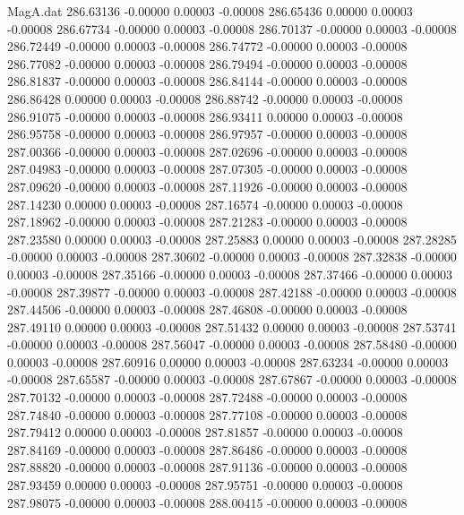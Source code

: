 \begin{filecontents}{MagA.dat}
 286.63136   -0.00000    0.00003   -0.00008
 286.65436    0.00000    0.00003   -0.00008
 286.67734   -0.00000    0.00003   -0.00008
 286.70137   -0.00000    0.00003   -0.00008
 286.72449   -0.00000    0.00003   -0.00008
 286.74772   -0.00000    0.00003   -0.00008
 286.77082   -0.00000    0.00003   -0.00008
 286.79494   -0.00000    0.00003   -0.00008
 286.81837   -0.00000    0.00003   -0.00008
 286.84144   -0.00000    0.00003   -0.00008
 286.86428    0.00000    0.00003   -0.00008
 286.88742   -0.00000    0.00003   -0.00008
 286.91075   -0.00000    0.00003   -0.00008
 286.93411    0.00000    0.00003   -0.00008
 286.95758   -0.00000    0.00003   -0.00008
 286.97957   -0.00000    0.00003   -0.00008
 287.00366   -0.00000    0.00003   -0.00008
 287.02696   -0.00000    0.00003   -0.00008
 287.04983   -0.00000    0.00003   -0.00008
 287.07305   -0.00000    0.00003   -0.00008
 287.09620   -0.00000    0.00003   -0.00008
 287.11926   -0.00000    0.00003   -0.00008
 287.14230    0.00000    0.00003   -0.00008
 287.16574   -0.00000    0.00003   -0.00008
 287.18962   -0.00000    0.00003   -0.00008
 287.21283   -0.00000    0.00003   -0.00008
 287.23580    0.00000    0.00003   -0.00008
 287.25883    0.00000    0.00003   -0.00008
 287.28285   -0.00000    0.00003   -0.00008
 287.30602   -0.00000    0.00003   -0.00008
 287.32838   -0.00000    0.00003   -0.00008
 287.35166   -0.00000    0.00003   -0.00008
 287.37466   -0.00000    0.00003   -0.00008
 287.39877   -0.00000    0.00003   -0.00008
 287.42188   -0.00000    0.00003   -0.00008
 287.44506   -0.00000    0.00003   -0.00008
 287.46808   -0.00000    0.00003   -0.00008
 287.49110    0.00000    0.00003   -0.00008
 287.51432    0.00000    0.00003   -0.00008
 287.53741   -0.00000    0.00003   -0.00008
 287.56047   -0.00000    0.00003   -0.00008
 287.58480   -0.00000    0.00003   -0.00008
 287.60916    0.00000    0.00003   -0.00008
 287.63234   -0.00000    0.00003   -0.00008
 287.65587   -0.00000    0.00003   -0.00008
 287.67867   -0.00000    0.00003   -0.00008
 287.70132   -0.00000    0.00003   -0.00008
 287.72488   -0.00000    0.00003   -0.00008
 287.74840   -0.00000    0.00003   -0.00008
 287.77108   -0.00000    0.00003   -0.00008
 287.79412    0.00000    0.00003   -0.00008
 287.81857   -0.00000    0.00003   -0.00008
 287.84169   -0.00000    0.00003   -0.00008
 287.86486   -0.00000    0.00003   -0.00008
 287.88820   -0.00000    0.00003   -0.00008
 287.91136   -0.00000    0.00003   -0.00008
 287.93459    0.00000    0.00003   -0.00008
 287.95751   -0.00000    0.00003   -0.00008
 287.98075   -0.00000    0.00003   -0.00008
 288.00415   -0.00000    0.00003   -0.00008

\end{filecontents}

